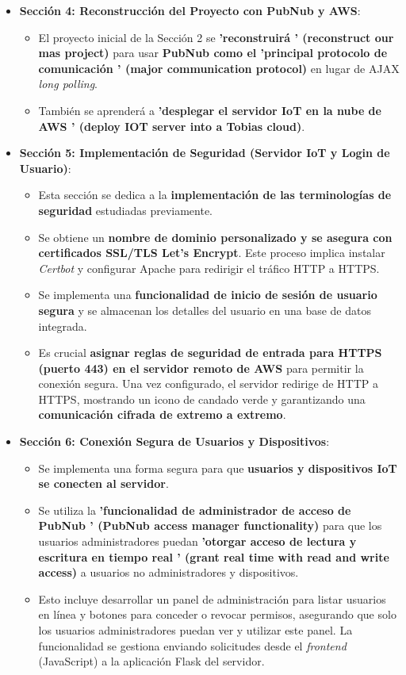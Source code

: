 \documentclass{report}
\begin{document}
\begin{itemize}
    \item \textbf{Sección 4: Reconstrucción del Proyecto con PubNub y AWS}:
    \begin{itemize}
        \item El proyecto inicial de la Sección 2 se \textbf{ 'reconstruirá ' (reconstruct our mas project)} para usar \textbf{PubNub como el 
        'principal protocolo de comunicación ' (major communication protocol)} en lugar de AJAX \textit{long polling}.
        \item También se aprenderá a \textbf{ 'desplegar el servidor IoT en la nube de AWS ' (deploy IOT server into a Tobias cloud)}.
    \end{itemize}

    \item \textbf{Sección 5: Implementación de Seguridad (Servidor IoT y Login de Usuario)}:
    \begin{itemize}
        \item Esta sección se dedica a la \textbf{implementación de las terminologías de seguridad} estudiadas previamente.
        \item Se obtiene un \textbf{nombre de dominio personalizado y se asegura con certificados SSL/TLS Let's Encrypt}. Este proceso implica instalar 
        \textit{Certbot} y configurar Apache para redirigir el tráfico HTTP a HTTPS.
        \item Se implementa una \textbf{funcionalidad de inicio de sesión de usuario segura} y se almacenan los detalles del usuario en una base de datos 
        integrada.
        \item Es crucial \textbf{asignar reglas de seguridad de entrada para HTTPS (puerto 443) en el servidor remoto de AWS} para permitir la conexión 
        segura. Una vez configurado, el servidor redirige de HTTP a HTTPS, mostrando un icono de candado verde y garantizando una \textbf{comunicación 
        cifrada de extremo a extremo}.
    \end{itemize}

    \item \textbf{Sección 6: Conexión Segura de Usuarios y Dispositivos}:
    \begin{itemize}
        \item Se implementa una forma segura para que \textbf{usuarios y dispositivos IoT se conecten al servidor}.
        \item Se utiliza la \textbf{ 'funcionalidad de administrador de acceso de PubNub ' (PubNub access manager functionality)} para que los usuarios 
        administradores puedan \textbf{ 'otorgar acceso de lectura y escritura en tiempo real ' (grant real time with read and write access)} a usuarios 
        no administradores y dispositivos.
        \item Esto incluye desarrollar un panel de administración para listar usuarios en línea y botones para conceder o revocar permisos, asegurando 
        que solo los usuarios administradores puedan ver y utilizar este panel. La funcionalidad se gestiona enviando solicitudes desde el \textit{frontend} 
        (JavaScript) a la aplicación Flask del servidor.
    \end{itemize}


\end{itemize}
\end{document}
